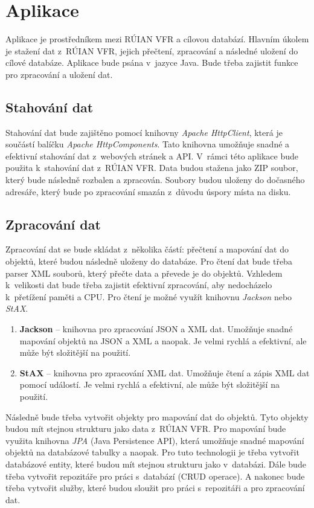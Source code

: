 \section{Aplikace}
Aplikace je prostředníkem mezi RÚIAN VFR a cílovou databází.
Hlavním úkolem je stažení dat z~RÚIAN VFR, jejich přečtení, zpracování a následné uložení do cílové databáze.
Aplikace bude psána v~jazyce Java. Bude třeba zajistit funkce pro zpracování a uložení dat.

\subsection{Stahování dat}
Stahování dat bude zajištěno pomocí knihovny \textit{Apache HttpClient}, která je 
součástí balíčku \textit{Apache HttpComponents}. 
Tato knihovna umožňuje snadné a efektivní stahování dat z~webových stránek a API. 
V~rámci této aplikace bude použita k~stahování dat z~RÚIAN VFR.
Data budou stažena jako ZIP soubor, který bude následně rozbalen a zpracován.
Soubory budou uloženy do dočasného adresáře, který bude po zpracování smazán z~důvodu úspory místa na disku.

\subsection{Zpracování dat}
Zpracování dat se bude skládat z~několika částí:
přečtení a mapování dat do objektů, které budou následně uloženy do databáze.
Pro čtení dat bude třeba parser XML souborů, který přečte data a převede je do objektů.
Vzhledem k~velikosti dat bude třeba zajistit efektivní zpracování, aby nedocházelo 
k~přetížení paměti a CPU.
Pro čtení je možné využít knihovnu \textit{Jackson} nebo \textit{StAX}.

\newpage

\begin{enumerate}
    \item \textbf{Jackson} -- knihovna pro zpracování JSON a XML dat. Umožňuje snadné mapování 
    objektů na JSON a XML a naopak. Je velmi rychlá a efektivní, ale může být složitější na použití.
    \item \textbf{StAX} -- knihovna pro zpracování XML dat. Umožňuje 
    čtení a zápis XML dat pomocí událostí. Je velmi rychlá a efektivní, ale může být 
    složitější na použití.
\end{enumerate}

Následně bude třeba vytvořit objekty pro mapování dat do objektů.
Tyto objekty budou mít stejnou strukturu jako data z~RÚIAN VFR.
Pro mapování bude využita knihovna \textit{JPA} (Java Persistence API), která umožňuje snadné 
mapování objektů na databázové tabulky a naopak.
Pro tuto technologii je třeba vytvořit databázové entity, které budou mít stejnou strukturu jako
v~databázi. Dále bude třeba vytvořit repozitáře pro práci s~databází (CRUD operace).
A nakonec bude třeba vytvořit služby, které budou sloužit pro práci s~repozitáři a pro zpracování dat.

